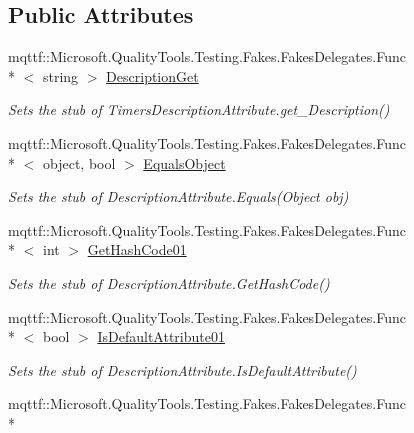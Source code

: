 \subsection*{Public Attributes}
\begin{DoxyCompactItemize}
\item 
mqttf\-::\-Microsoft.\-Quality\-Tools.\-Testing.\-Fakes.\-Fakes\-Delegates.\-Func\\*
$<$ string $>$ \hyperlink{class_system_1_1_timers_1_1_fakes_1_1_stub_timers_description_attribute_a39f24de2ed9170a58c228c5f7bba4545}{Description\-Get}
\begin{DoxyCompactList}\small\item\em Sets the stub of Timers\-Description\-Attribute.\-get\-\_\-\-Description()\end{DoxyCompactList}\item 
mqttf\-::\-Microsoft.\-Quality\-Tools.\-Testing.\-Fakes.\-Fakes\-Delegates.\-Func\\*
$<$ object, bool $>$ \hyperlink{class_system_1_1_timers_1_1_fakes_1_1_stub_timers_description_attribute_a70120cda8d0400139935d0e556057ae7}{Equals\-Object}
\begin{DoxyCompactList}\small\item\em Sets the stub of Description\-Attribute.\-Equals(\-Object obj)\end{DoxyCompactList}\item 
mqttf\-::\-Microsoft.\-Quality\-Tools.\-Testing.\-Fakes.\-Fakes\-Delegates.\-Func\\*
$<$ int $>$ \hyperlink{class_system_1_1_timers_1_1_fakes_1_1_stub_timers_description_attribute_a96d543e970a704c3f755d7572457bb9d}{Get\-Hash\-Code01}
\begin{DoxyCompactList}\small\item\em Sets the stub of Description\-Attribute.\-Get\-Hash\-Code()\end{DoxyCompactList}\item 
mqttf\-::\-Microsoft.\-Quality\-Tools.\-Testing.\-Fakes.\-Fakes\-Delegates.\-Func\\*
$<$ bool $>$ \hyperlink{class_system_1_1_timers_1_1_fakes_1_1_stub_timers_description_attribute_af590fb4d1d020716be48be2a85e9d9cb}{Is\-Default\-Attribute01}
\begin{DoxyCompactList}\small\item\em Sets the stub of Description\-Attribute.\-Is\-Default\-Attribute()\end{DoxyCompactList}\item 
mqttf\-::\-Microsoft.\-Quality\-Tools.\-Testing.\-Fakes.\-Fakes\-Delegates.\-Func\\*

\end{DoxyCompactItemize}
